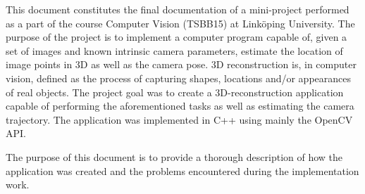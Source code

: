 This document constitutes the final documentation of a mini-project performed as a part of the course Computer Vision (TSBB15) at Linköping University. The purpose of the project is to implement a computer program capable of, given a set of images and known intrinsic camera parameters, estimate the location of image points in 3D as well as the camera pose. 3D reconstruction is, in computer vision, defined as the process of capturing shapes, locations and/or appearances of real objects. The project goal was to create a 3D-reconstruction application capable of performing the aforementioned tasks as well as estimating the camera trajectory. The application was implemented in C++ using mainly the OpenCV API.

The purpose of this document is to provide a thorough description of how the application was created and the problems encountered during the implementation work.